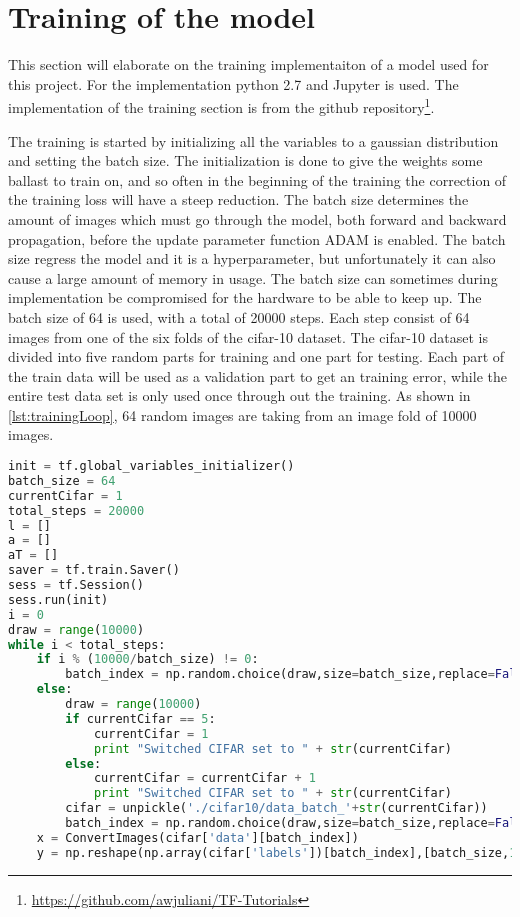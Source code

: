 \section{Training of the model}

This section will elaborate on the training implementaiton of a model used for this project. For the implementation python 2.7 and Jupyter is used. The implementation of the training section is from the github repository\footnote{\url{https://github.com/awjuliani/TF-Tutorials}}.

The training is started by initializing all the variables to a gaussian distribution and setting the batch size. The initialization is done to give the weights some ballast to train on, and so often in the beginning of the training the correction of the training loss will have a steep reduction. The batch size determines the amount of images which must go through the model, both forward and backward propagation, before the update parameter function ADAM is enabled. The batch size regress the model and it is a hyperparameter, but unfortunately it can also cause a large amount of memory in usage. The batch size can sometimes during implementation be compromised for the hardware to be able to keep up. The batch size of 64 is used, with a total of 20000 steps. Each step consist of 64 images from one of the six folds of the cifar-10 dataset. The cifar-10 dataset is divided into five random parts for training and one part for testing. Each part of the train data will be used as a validation part to get an training error, while the entire test data set is only used once through out the training. As shown in \ref{lst:trainingLoop}, 64 random images are taking from an image fold of 10000 images. 

\begin{lstlisting}[language=Python, label=lst:trainingLoop, caption=for loop which finds the 64 training images for training the model]
init = tf.global_variables_initializer()
batch_size = 64
currentCifar = 1
total_steps = 20000
l = []
a = []
aT = []
saver = tf.train.Saver()
sess = tf.Session()
sess.run(init)
i = 0
draw = range(10000)
while i < total_steps:
	if i % (10000/batch_size) != 0:
		batch_index = np.random.choice(draw,size=batch_size,replace=False)
	else:
		draw = range(10000)
		if currentCifar == 5:
			currentCifar = 1
			print "Switched CIFAR set to " + str(currentCifar)
		else:
			currentCifar = currentCifar + 1
			print "Switched CIFAR set to " + str(currentCifar)
		cifar = unpickle('./cifar10/data_batch_'+str(currentCifar))
		batch_index = np.random.choice(draw,size=batch_size,replace=False)
	x = ConvertImages(cifar['data'][batch_index])  
	y = np.reshape(np.array(cifar['labels'])[batch_index],[batch_size,1])
\end{lstlisting}

